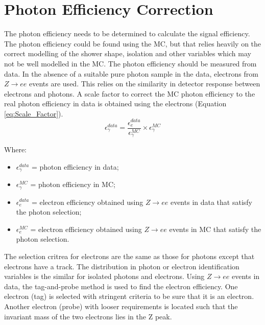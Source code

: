 \section{Photon Efficiency Correction}

The photon efficiency needs to be determined to calculate the signal efficiency.
The photon efficiency could be found using the MC, but that relies heavily on
the correct modelling of the shower shape, isolation and other variables which
may not be well modelled in the MC. The photon efficiency should be measured
from data. In the absence of a suitable pure photon sample in the data, 
electrons from $Z\rightarrow ee$ events are used. This relies on the similarity 
in detector response between electrons and photons. A scale factor to correct 
the MC photon efficiency to the real photon efficiency in data is obtained using 
the electrons (Equation \ref{eq:Scale_Factor}). \\

\begin{equation}
\epsilon_{\gamma}^{data} = \frac{\epsilon_{e}^{data}}{\epsilon_{\gamma}^{MC}}
\times \epsilon_{\gamma}^{MC}
\label{eq:Scale_Factor}
\end{equation}  

Where:
\begin{itemize}
\item $\epsilon_{\gamma}^{data}$ = photon efficiency in data;
\item $\epsilon_{\gamma}^{MC}$ = photon efficiency in MC;
\item $\epsilon_{e}^{data}$ = electron efficiency obtained using $Z\rightarrow
ee$ events in data that satisfy the photon selection; 
\item $\epsilon_{e}^{MC}$ = electron efficiency obtained using $Z\rightarrow ee$
events in MC that satisfy the photon selection. 
\end{itemize}

The selection critrea for electrons are the same as those for photons except 
that electrons have a track. The distribution in photon or electron 
identification variables is the similar for isolated photons and electrons. 
Using $Z\rightarrow ee$ events in data, the tag-and-probe method is used to find
the electron efficiency. One electron (tag) is selected with stringent criteria 
to be sure that it is an electron. Another electron (probe) with looser 
requirements is located such that the invariant mass of the two electrons lies 
in the Z peak. \\

